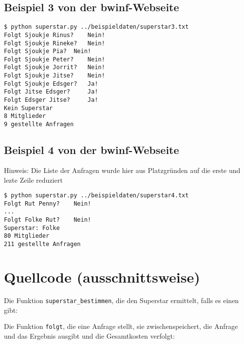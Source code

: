 \documentclass[a4paper,10pt,ngerman]{scrartcl}
\begin{document}
\subsection{Beispiel 3 von der bwinf-Webseite}
\begin{lstlisting}
$ python superstar.py ../beispieldaten/superstar3.txt
Folgt Sjoukje Rinus? 	Nein!
Folgt Sjoukje Rineke? 	Nein!
Folgt Sjoukje Pia? 	Nein!
Folgt Sjoukje Peter? 	Nein!
Folgt Sjoukje Jorrit? 	Nein!
Folgt Sjoukje Jitse? 	Nein!
Folgt Sjoukje Edsger? 	Ja!
Folgt Jitse Edsger? 	Ja!
Folgt Edsger Jitse? 	Ja!
Kein Superstar
8 Mitglieder
9 gestellte Anfragen
\end{lstlisting}

\subsection{Beispiel 4 von der bwinf-Webseite}
Hinweis: Die Liste der Anfragen wurde hier aus Platzgründen auf die erste und lezte Zeile reduziert
\begin{lstlisting}
$ python superstar.py ../beispieldaten/superstar4.txt
Folgt Rut Penny? 	Nein!
...
Folgt Folke Rut? 	Nein!
Superstar: Folke
80 Mitglieder
211 gestellte Anfragen
\end{lstlisting}

\section{Quellcode (ausschnittsweise)}

Die Funktion \texttt{superstar\_bestimmen}, die den Superstar ermittelt, falls es einen gibt:


\vspace{30pt}

Die Funktion \texttt{folgt}, die eine Anfrage stellt, sie zwischenspeichert, die Anfrage und das Ergebnis ausgibt und die Gesamtkosten verfolgt:

\end{document}
